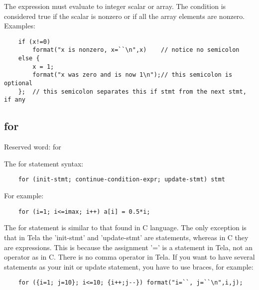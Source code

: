 \documentclass[a4paper]{article}
\begin{document}
The expression must evaluate to integer scalar or array. The condition is
considered true if the scalar is nonzero or if all the array elements are
nonzero. Examples:

\begin{tscreen}
\begin{verbatim}
    if (x!=0)
        format("x is nonzero, x=``\n",x)    // notice no semicolon
    else {
        x = 1;
        format("x was zero and is now 1\n");// this semicolon is optional
    };  // this semicolon separates this if stmt from the next stmt, if any
\end{verbatim}
\end{tscreen}





\subsection{for\label{for}}

Reserved word: for

The for statement syntax:

\begin{tscreen}
\begin{verbatim}
    for (init-stmt; continue-condition-expr; update-stmt) stmt
\end{verbatim}
\end{tscreen}


For example:

\begin{tscreen}
\begin{verbatim}
    for (i=1; i<=imax; i++) a[i] = 0.5*i;
\end{verbatim}
\end{tscreen}


The for statement is similar to that found in C language. The only exception
is that in Tela the 'init-stmt' and 'update-stmt' are statements, whereas in C
they are expressions. This is because the assignment '=' is a statement in
Tela, not an operator as in C. There is no comma operator in Tela. If you
want to have several statements as your init or update statement, you have
to use braces, for example:

\begin{tscreen}
\begin{verbatim}
    for ({i=1; j=10}; i<=10; {i++;j--}) format("i=``, j=``\n",i,j);
\end{verbatim}
\end{tscreen}
\end{document}
